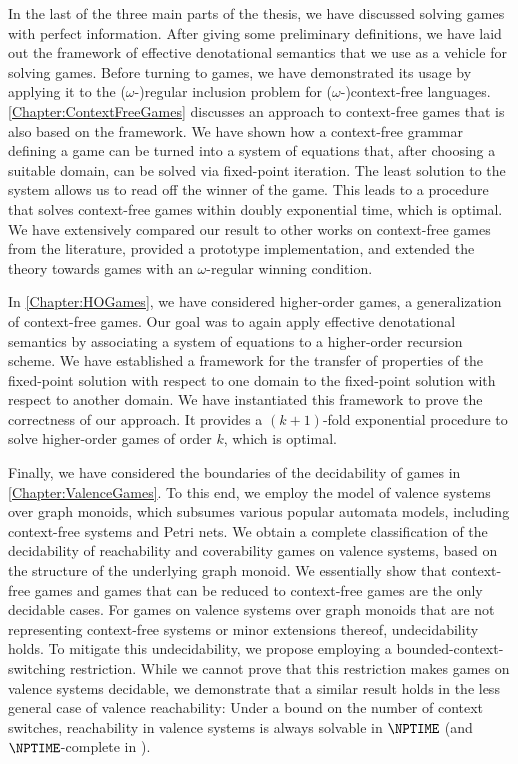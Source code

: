 \documentclass[../../diss.tex]{subfiles}
\begin{document}
In the last of the three main parts of the thesis, we have discussed solving games with perfect information.
After giving some preliminary definitions, we have laid out the framework of effective denotational semantics that we use as a vehicle for solving games.
Before turning to games, we have demonstrated its usage by applying it to the ($\omega$-)regular inclusion problem for ($\omega$-)context-free languages.
\cref{Chapter:ContextFreeGames} discusses an approach to context-free games that is also based on the framework.
We have shown how a context-free grammar defining a game can be turned into a system of equations that, after choosing a suitable domain, can be solved via fixed-point iteration.
The least solution to the system allows us to read off the winner of the game.
This leads to a procedure that solves context-free games within doubly exponential time, which is optimal.
We have extensively compared our result to other works on context-free games from the literature, provided a prototype implementation, and extended the theory towards games with an $\omega$-regular winning condition.

In \cref{Chapter:HOGames}, we have considered higher-order games, a generalization of context-free games.
Our goal was to again apply effective denotational semantics by associating a system of equations to a higher-order recursion scheme.
We have established a framework for the transfer of properties of the fixed-point solution with respect to one domain to the fixed-point solution with respect to another domain.
We have instantiated this framework to prove the correctness of our approach.
It provides a $(k+1)$-fold exponential procedure to solve higher-order games of order $k$, which is optimal.

Finally, we have considered the boundaries of the decidability of games in \cref{Chapter:ValenceGames}.
To this end, we employ the model of valence systems over graph monoids, which subsumes various popular automata models, including context-free systems and Petri nets.
We obtain a complete classification of the decidability of reachability and coverability games on valence systems, based on the structure of the underlying graph monoid.
We essentially show that context-free games and games that can be reduced to context-free games are the only decidable cases.
For games on valence systems over graph monoids that are not representing context-free systems or minor extensions thereof, undecidability holds.
To mitigate this undecidability, we propose employing a bounded-context-switching restriction.
While we cannot prove that this restriction makes games on valence systems decidable, we demonstrate that a similar result holds in the less general case of valence reachability:
Under a bound on the number of context switches, reachability in valence systems is always solvable in $\NPTIME$ (and $\NPTIME$-complete in ).
\end{document}
